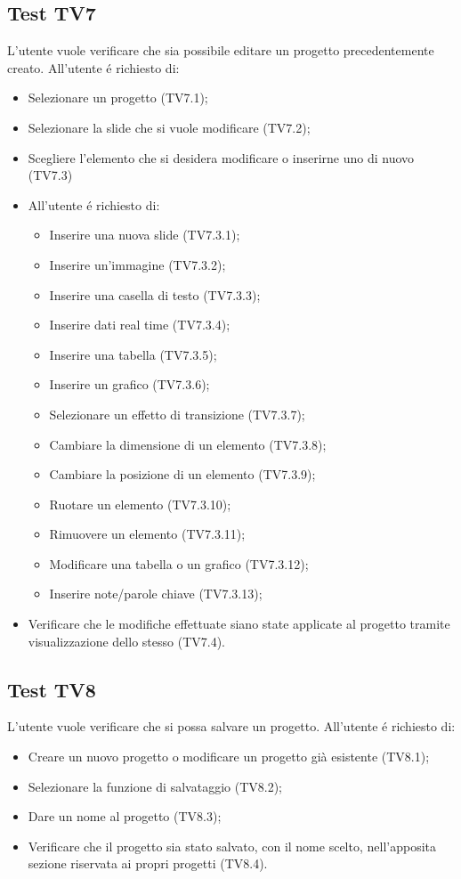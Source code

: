 \subsection{Test TV7}
L'utente vuole verificare che sia possibile editare un progetto precedentemente creato. \newline
All'utente \'e richiesto di:
\begin{itemize}
	\item Selezionare un progetto (TV7.1);
	\item Selezionare la slide che si vuole modificare (TV7.2);
	\item Scegliere l'elemento che si desidera modificare o inserirne uno di nuovo (TV7.3)
	\item[] All'utente \'e richiesto di:
	\begin{itemize}
		\item Inserire una nuova slide (TV7.3.1);
		\item Inserire un'immagine (TV7.3.2);
		\item Inserire una casella di testo (TV7.3.3);
		\item Inserire dati \gls{real time} (TV7.3.4);
		\item Inserire una tabella (TV7.3.5);
		\item Inserire un grafico (TV7.3.6);
		\item Selezionare un effetto di transizione (TV7.3.7);
		\item Cambiare la dimensione di un elemento (TV7.3.8);
		\item Cambiare la posizione di un elemento (TV7.3.9);
		\item Ruotare un elemento (TV7.3.10);
		\item Rimuovere un elemento (TV7.3.11);
		\item Modificare una tabella o un grafico (TV7.3.12);
		\item Inserire note/parole chiave (TV7.3.13);
	\end{itemize}
	\item Verificare che le modifiche effettuate siano state applicate al progetto tramite visualizzazione dello stesso (TV7.4).
\end{itemize}

\subsection{Test TV8}
L'utente vuole verificare che si possa salvare un progetto. \newline
All'utente \'e richiesto di:
\begin{itemize}
	\item Creare un nuovo progetto o modificare un progetto già esistente (TV8.1);
	\item Selezionare la funzione di salvataggio (TV8.2);
	\item Dare un nome al progetto (TV8.3);
	\item Verificare che il progetto sia stato salvato, con il nome scelto, nell'apposita sezione riservata ai propri progetti (TV8.4).
\end{itemize}

